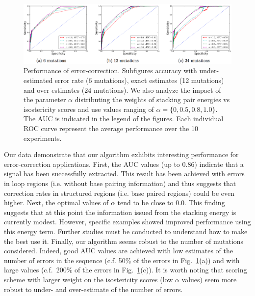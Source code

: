 \begin{figure}
\begin{center}
	\includegraphics[width=\textwidth]{subfigs_perform.png}
\end{center}
\caption{Performance of error-correction. Subfigures accuracy with under-estimated error rate (6 mutations), exact estimates (12 mutations) and over estimates 
(24 mutations). We also analyze the impact of the parameter $\alpha$ distributing the weights of stacking pair energies vs isostericity scores and use values 
ranging of $\alpha=\{0,0.5,0.8,1.0\}$. The AUC is indicated in the legend of the figures. Each individual ROC curve represent the average performance over the 10 experiments.}
\label{fig:ROCall}
\end{figure}

Our data demonstrate that our algorithm exhibits interesting performance for error-correction applications. First, the AUC values (up to $0.86$) indicate that a
signal has been successfully extracted. This result has been achieved with errors in loop regions (i.e. without base pairing information) and thus suggests
that correction rates in structured regions (i.e. base paired regions) could be even higher. Next, the optimal values of $\alpha$ tend to be close to $0.0$. This 
finding suggests that at this point the information issued from the stacking energy is currently modest. However, specific examples showed improved performance
using this energy term. Further studies must be conducted to understand how to make the best use it. Finally, our algorithm seems robust to the number of
mutations considered. Indeed, good AUC values are achieved with low estimates of the number of errors in the sequence (c.f. 50\% of the errors  in
Fig.~\ref{fig:ROCall}(a)) and with large  values (c.f.~200\% of the errors  in Fig.~\ref{fig:ROCall}(c)). It is worth noting that scoring scheme with larger weight on
the isostericity scores (low $\alpha$ values) seem more robust to under- and over-estimate of the number of errors.




